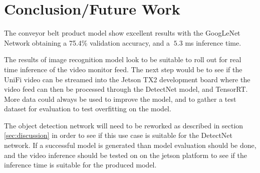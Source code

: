 \documentclass[10pt,journal,compsoc]{IEEEtran}
\begin{document}
\section{Conclusion/Future Work}
\label{sec:conclusion}

The conveyor belt product model show excellent results with the GoogLeNet Network obtaining a 75.4\% validation accuracy, and a $~5.3$ ms inference time.

The results of image recognition model look to be suitable to roll out for real time inference of the video monitor feed. The next step would be to see if the UniFi video can be streamed into the Jetson TX2 development board where the video feed can then be processed through the DetectNet model, and TensorRT. More data could always be used to improve the model, and to gather a test dataset for evaluation to test overfitting on the model.

The object detection network will need to be reworked as described in section \ref{sec:discussion} in order to see if this use case is suitable for the DetectNet network. If a successful model is generated than model evaluation should be done, and the video inference should be tested on on the jetson platform to see if the inference time is suitable for the produced model.




\end{document}
